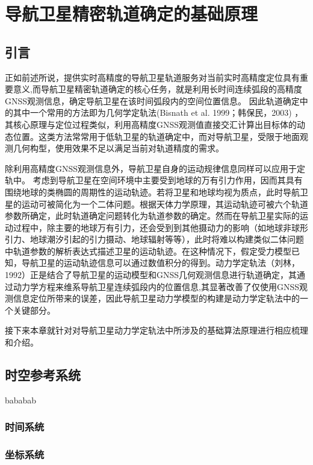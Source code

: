 
\chapter{导航卫星精密轨道确定的基础原理}

\section{引言}

正如前述所说，提供实时高精度的导航卫星轨道服务对当前实时高精度定位具有重要意义,而导航卫星精密轨道确定的核心任务，就是利用长时间连续弧段的高精度GNSS观测信息，确定导航卫星在该时间弧段内的空间位置信息。
因此轨道确定中的其中一个常用的方法即为几何学定轨法(Bisnath et al. 1999；韩保民，2003) ，其核心原理与定位过程类似，利用高精度GNSS观测值直接交汇计算出目标体的动态位置。这类方法常常用于低轨卫星的轨道确定中，而对导航卫星，受限于地面观测几何构型，使用效果不足以满足当前对轨道精度的需求。

除利用高精度GNSS观测信息外，导航卫星自身的运动规律信息同样可以应用于定轨中。
考虑到导航卫星在空间环境中主要受到地球的万有引力作用，因而其具有围绕地球的类椭圆的周期性的运动轨迹。若将卫星和地球均视为质点，此时导航卫星的运动可被简化为一个二体问题。根据天体力学原理，其运动轨迹可被六个轨道参数所确定，此时轨道确定问题转化为轨道参数的确定。然而在导航卫星实际的运动过程中，除主要的地球万有引力，还会受到到其他摄动力的影响（如地球非球形引力、地球潮汐引起的引力摄动、地球辐射等等），此时将难以构建类似二体问题中轨道参数的解析表达式描述卫星的运动轨迹。在这种情况下，假定受力模型已知，导航卫星的运动轨迹信息可以通过数值积分的得到。动力学定轨法（刘林，1992）正是结合了导航卫星的运动模型和GNSS几何观测信息进行轨道确定，其通过动力学方程来维系导航卫星连续弧段内的位置信息,其显著改善了仅使用GNSS观测信息定位所带来的误差，因此导航卫星动力学模型的构建是动力学定轨法中的一个关键部分。

接下来本章就针对对导航卫星动力学定轨法中所涉及的基础算法原理进行相应梳理和介绍。

\section{时空参考系统}

bababab

\subsection{时间系统}

\subsection{坐标系统}

